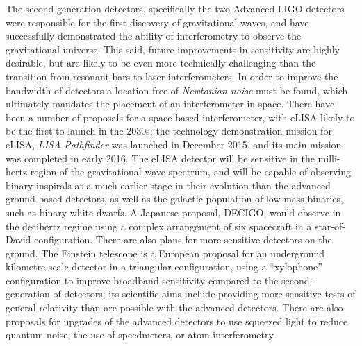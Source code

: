   The second-generation detectors, specifically the two Advanced LIGO
  detectors were responsible for the first discovery of gravitational
  waves\cite{2016PhRvL.116m1103A}, and have successfully demonstrated
  the ability of interferometry to observe the gravitational
  universe. This said, future improvements in sensitivity are highly
  desirable, but are likely to be even more technically challenging
  than the transition from resonant bars to laser interferometers. In
  order to improve the bandwidth of detectors a location free of
  \emph{Newtonian noise} must be found, which ultimately mandates the
  placement of an interferometer in space. There have been a number of
  proposals for a space-based interferometer, with
  eLISA\cite{2013GWN.....6....4A} likely to be the first to launch in
  the 2030s; the technology demonstration mission for eLISA,
  \emph{LISA Pathfinder} was launched in December 2015, and its main
  mission was completed in early 2016\cite{2016PhRvL.116w1101A}. The
  eLISA detector will be sensitive in the milli-hertz region of the
  gravitational wave spectrum, and will be capable of observing binary
  inspirals at a much earlier stage in their evolution than the
  advanced ground-based detectors, as well as the galactic population
  of low-mass binaries, such as binary white dwarfs. A Japanese
  proposal, DECIGO\cite{2011CQGra..28i4011K}, would observe in the
  decihertz regime using a complex arrangement of six spacecraft in a
  star-of-David configuration. There are also plans for more sensitive
  detectors on the ground. The Einstein telescope is a European
  proposal for an underground kilometre-scale detector in a triangular
  configuration, using a ``xylophone'' configuration to improve
  broadband sensitivity compared to the second-generation of
  detectors; its scientific aims include providing more sensitive
  tests of general relativity than are possible with the advanced
  detectors\cite{2012CQGra..29l4013S}. There are also proposals for
  upgrades of the advanced detectors to use squeezed light to reduce
  quantum noise\cite{2015PhRvD..91f2005M}, the use of
  speedmeters\cite{2014MUPB...69..519V,2002gr.qc....11088K}, or atom
  interferometry\cite{2013PhRvL.110q1102G,2016PhRvD..93b1101C,2008PhRvD..78l2002D}.




